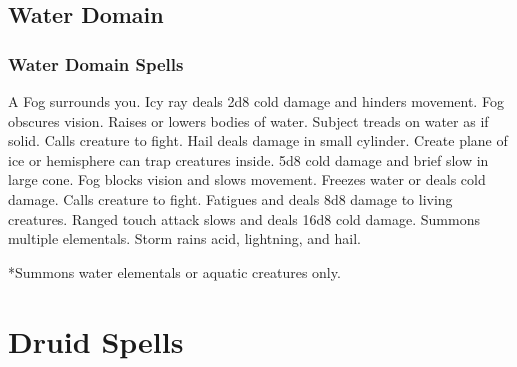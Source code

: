 \subsection{Water Domain}
\subsubsection{Water Domain Spells}
\begin{spelllist}
   A Fog surrounds you.
   Icy ray deals 2d8 cold damage and hinders movement.
   Fog obscures vision.
  \spellhead[2]{}
   Raises or lowers bodies of water.
   Subject treads on water as if solid.
  \spellhead[4]{}
   Calls creature to fight.
   Hail deals damage in small cylinder.
   Create plane of ice or hemisphere can trap creatures inside.
   5d8 cold damage and brief slow in large cone.
   Fog blocks vision and slows movement.
   Freezes water or deals cold damage.
   Calls creature to fight.
   Fatigues and deals 8d8 damage to living creatures.
   Ranged touch attack slows and deals 16d8 cold damage.
   Summons multiple elementals.
   Storm rains acid, lightning, and hail.
\end{spelllist}
*Summons water elementals or aquatic creatures only.


\section{Druid Spells}

